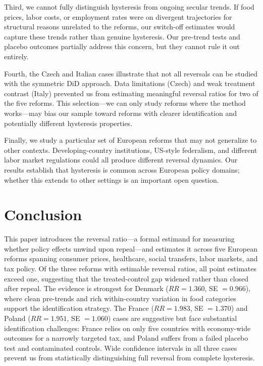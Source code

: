 \documentclass[12pt]{article}
\begin{document}
Third, we cannot fully distinguish hysteresis from ongoing secular trends. If food prices, labor costs, or employment rates were on divergent trajectories for structural reasons unrelated to the reforms, our switch-off estimates would capture these trends rather than genuine hysteresis. Our pre-trend tests and placebo outcomes partially address this concern, but they cannot rule it out entirely.

Fourth, the Czech and Italian cases illustrate that not all reversals can be studied with the symmetric DiD approach. Data limitations (Czech) and weak treatment contrast (Italy) prevented us from estimating meaningful reversal ratios for two of the five reforms. This selection---we can only study reforms where the method works---may bias our sample toward reforms with clearer identification and potentially different hysteresis properties.

Finally, we study a particular set of European reforms that may not generalize to other contexts. Developing-country institutions, US-style federalism, and different labor market regulations could all produce different reversal dynamics. Our results establish that hysteresis is common across European policy domains; whether this extends to other settings is an important open question.


\section{Conclusion}
\label{sec:conclusion}

This paper introduces the reversal ratio---a formal estimand for measuring whether policy effects unwind upon repeal---and estimates it across five European reforms spanning consumer prices, healthcare, social transfers, labor markets, and tax policy. Of the three reforms with estimable reversal ratios, all point estimates exceed one, suggesting that the treated-control gap widened rather than closed after repeal. The evidence is strongest for Denmark ($RR = 1.360$, SE $= 0.966$), where clean pre-trends and rich within-country variation in food categories support the identification strategy. The France ($RR = 1.983$, SE $= 1.370$) and Poland ($RR = 1.951$, SE $= 1.060$) cases are suggestive but face substantial identification challenges: France relies on only five countries with economy-wide outcomes for a narrowly targeted tax, and Poland suffers from a failed placebo test and contaminated controls. Wide confidence intervals in all three cases prevent us from statistically distinguishing full reversal from complete hysteresis.
\end{document}
